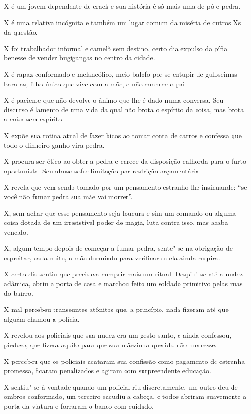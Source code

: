  

X é um jovem dependente de crack e sua história é só mais uma de pó e
pedra.

X é uma relativa incógnita e também um lugar comum da miséria de outros
Xs da questão.

X foi trabalhador informal e camelô sem destino, certo dia expulso da
pífia benesse de vender bugigangas no centro da cidade.

X é rapaz conformado e melancólico, meio balofo por se entupir de
guloseimas baratas, filho único que vive com a mãe, e não conhece o pai.

X é paciente que não devolve o ânimo que lhe é dado numa conversa. Seu
discurso é lamento de uma vida da qual não brota o espírito da coisa, mas
brota a coisa sem espírito.

X expõe sua rotina atual de fazer bicos ao tomar conta de carros e
confessa que todo o dinheiro ganho vira pedra.

X procura ser ético ao obter a pedra e carece da disposição calhorda
para o furto oportunista. Seu abuso sofre limitação por restrição
orçamentária.

X revela que vem sendo tomado por um pensamento estranho lhe insinuando:
``se você não fumar pedra sua mãe vai morrer''.

X, sem achar que esse pensamento seja loucura e sim um comando ou alguma
coisa dotada de um irresistível poder de magia, luta contra isso, mas
acaba vencido.

X, algum tempo depois de começar a fumar pedra, sente"-se na obrigação de
espreitar, cada noite, a mãe dormindo para verificar se ela ainda
respira.

X certo dia sentiu que precisava cumprir mais um ritual. Despiu"-se até a
nudez adâmica, abriu a porta de casa e marchou feito um soldado
primitivo pelas ruas do bairro.

X mal percebeu transeuntes atônitos que, a princípio, nada fizeram até
que alguém chamou a polícia.

X revelou aos policiais que sua nudez era um gesto santo, e ainda
confessou, piedoso, que fizera aquilo para que sua mãezinha querida não
morresse.

X percebeu que os policiais acataram sua confissão como pagamento de
estranha promessa, ficaram penalizados e agiram com surpreendente
educação.

X sentiu"-se à vontade quando um policial riu discretamente, um outro deu
de ombros conformado, um terceiro sacudiu a cabeça, e todos abriram
suavemente a porta da viatura e forraram o banco com cuidado.

